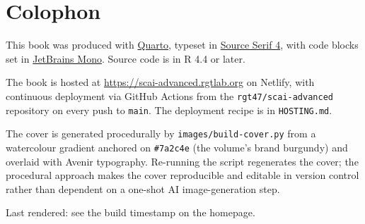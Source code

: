 \documentclass[
  letterpaper,
  11pt]{scrbook}
\begin{document}
\chapter*{Colophon}\label{colophon}


This book was produced with \href{https://quarto.org}{Quarto}, typeset
in \href{https://fonts.adobe.com/fonts/source-serif}{Source Serif 4},
with code blocks set in
\href{https://www.jetbrains.com/lp/mono/}{JetBrains Mono}. Source code
is in R 4.4 or later.

The book is hosted at \url{https://scai-advanced.rgtlab.org} on Netlify,
with continuous deployment via GitHub Actions from the
\texttt{rgt47/scai-advanced} repository on every push to \texttt{main}.
The deployment recipe is in \texttt{HOSTING.md}.

The cover is generated procedurally by \texttt{images/build-cover.py}
from a watercolour gradient anchored on \texttt{\#7a2c4e} (the volume's
brand burgundy) and overlaid with Avenir typography. Re-running the
script regenerates the cover; the procedural approach makes the cover
reproducible and editable in version control rather than dependent on a
one-shot AI image-generation step.

Last rendered: see the build timestamp on the homepage.


\backmatter
\end{document}
